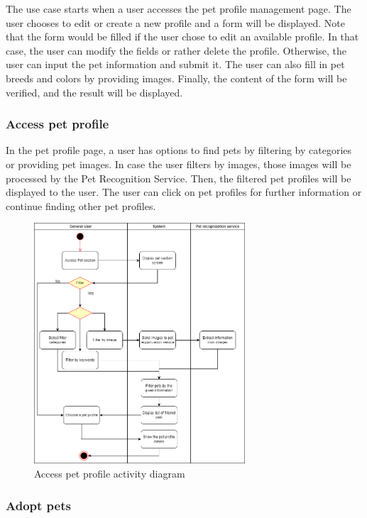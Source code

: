 The use case starts when a user accesses the pet profile management page. The user chooses to edit or create a new profile and a form will be displayed. Note that the form would be filled if the user chose to edit an available profile. In that case, the user can modify the fields or rather delete the profile. Otherwise, the user can input the pet information and submit it. The user can also fill in pet breeds and colors by providing images. Finally, the content of the form will be verified, and the result will be displayed.


\subsubsection{Access pet profile}

In the pet profile page, a user has options to find pets by filtering by categories or providing pet images. In case the user filters by images, those images will be processed by the Pet Recognition Service. Then, the filtered pet profiles will be displayed to the user. The user can click on pet profiles for further information or continue finding other pet profiles.

\begin{figure}[H]
  \centering
  \includegraphics[width=0.7\textwidth]{Figures/access_pet.png}
  \caption{Access pet profile activity diagram}
  \label{fig:access-pet}
\end{figure}

\subsubsection{Adopt pets}

